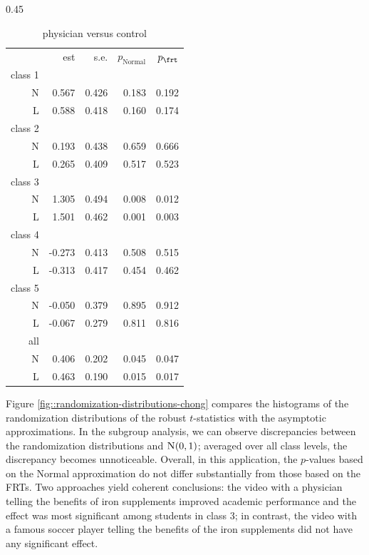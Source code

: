 \begin{table}
\begin{subtable}[h]{0.45\textwidth} 
\caption{physician versus control}
    \begin{tabular}{rrrrr}
    \hline 
   &    est & s.e. &$p_\text{Normal}$ & $p_\frt$ \\
       class 1& &&&\\
\textsc{N}  &  0.567 &0.426  &    0.183 &  0.192 \\
\textsc{L}   &   0.588& 0.418  &   0.160  & 0.174 \\
       class 2& &&&\\
\textsc{N}  &   0.193& 0.438 &     0.659 &  0.666 \\
\textsc{L}   &  0.265& 0.409   &   0.517  & 0.523 \\
       class 3& &&&\\
\textsc{N}  &  1.305& 0.494  &    0.008 &  0.012\\
\textsc{L}   &  1.501& 0.462   &   0.001  & 0.003 \\
       class 4& &&&\\
\textsc{N}  &  -0.273& 0.413  &    0.508 &  0.515 \\
\textsc{L}   &  -0.313& 0.417   &   0.454  & 0.462\\
       class 5& &&&\\
\textsc{N}  & -0.050 &0.379  &    0.895 &  0.912 \\
\textsc{L}   &  -0.067& 0.279  &    0.811 &  0.816 \\
       all& &&&\\
\textsc{N}  &  0.406 & 0.202   &   0.045 &  0.047\\
\textsc{L}   &    0.463 & 0.190   &   0.015  & 0.017 \\
\hline 
    \end{tabular}
\end{subtable}
\end{table}

Figure \ref{fig::randomization-distributions-chong} compares the histograms of the randomization distributions of the robust $t$-statistics with the asymptotic approximations. In the subgroup analysis, we can observe discrepancies between the randomization distributions and $\textsc{N}(0,1)$; averaged over all class levels, the discrepancy becomes unnoticeable. Overall, in this application, the $p$-values based on the Normal approximation do not differ substantially from those based on the FRTs. Two approaches yield coherent conclusions: the video with a physician telling the benefits of iron supplements improved academic performance and the effect was most significant among students in class 3; in contrast, the video with a famous soccer player telling the benefits of the iron supplements did not have any significant effect. 


